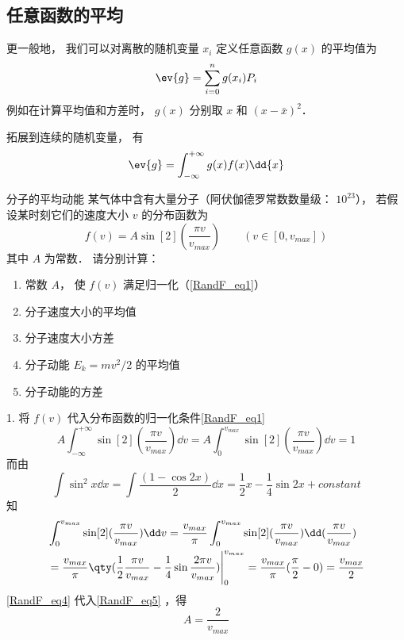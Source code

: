 \subsection{任意函数的平均}
更一般地， 我们可以对离散的随机变量 $x_i$ 定义任意函数 $g(x)$ 的平均值为
\begin{equation}\label{RandF_eq3}
\ev{g} = \sum_{i=0}^n g(x_i) P_i
\end{equation}
例如在计算平均值和方差时， $g(x)$ 分别取 $x$ 和 $(x - \bar x)^2$．

拓展到连续的随机变量， 有
\begin{equation}\label{RandF_eq2}
\ev{g} = \int_{-\infty}^{+\infty} g(x) f(x) \dd{x}
\end{equation}

\begin{example}{分子的平均动能}
某气体中含有大量分子（阿伏伽德罗常数数量级： $10^{23}$）， 若假设某时刻它们的速度大小 $v$ 的分布函数为
\begin{equation}
f(v) = A \sin[2](\frac{\pi v}{v_{max}}) \qquad (v \in [0, v_{max}])
\end{equation}
其中 $A$ 为常数． 请分别计算：
\begin{enumerate}
\item 常数 $A$， 使 $f(v)$ 满足归一化（\autoref{RandF_eq1}）
\item 分子速度大小的平均值
\item 分子速度大小方差
\item 分子动能 $E_k = mv^2/2$ 的平均值
\item 分子动能的方差
\end{enumerate}
1. 将 $f(v)$ 代入分布函数的归一化条件\autoref{RandF_eq1} 
\begin{equation}\label{RandF_eq5}
A\int_{-\infty}^{+\infty} \sin[2](\frac{\pi v}{v_{max}})\dd v =A\int_{0}^{v_{max}} \sin[2](\frac{\pi v}{v_{max}})\dd v= 1
\end{equation}
而由
\begin{equation}
\int \sin^2 x\dd x = \int\frac{(1-\cos 2x)}{2}\dd x = \frac{1}{2}x-\frac{1}{4}\sin 2x+constant
\end{equation}
知
\begin{equation}\label{RandF_eq4}
\begin{aligned}
&\int_{0}^{v_{max}} \sin[2](\frac{\pi v}{v_{max}})\dd v=\frac{v_{max}}{\pi}\int_{0}^{v_{max}} \sin[2](\frac{\pi v}{v_{max}})\dd (\frac{\pi v}{v_{max}})\\
&=\frac{v_{max}}{\pi}\qty (\frac{1}{2}\frac{\pi v}{v_{max}}-\frac{1}{4}\sin \frac{2\pi v}{v_{max}})\Bigg|_{0}^{v_{max}}=\frac{v_{max}}{\pi}(\frac{\pi}{2}-0)=\frac{v_{max}}{2}
\end{aligned}
\end{equation}
\autoref{RandF_eq4} 代入\autoref{RandF_eq5} ，得 
\begin{equation}
A=\frac{2}{v_{max}}
\end{equation}


\end{example}
